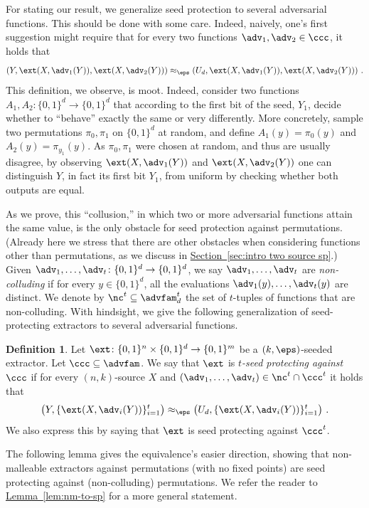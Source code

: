 \documentclass[11pt]{article}
\numberwithin{equation}{section}
\theoremstyle{definition}
\newtheorem{definition}[theorem]{Definition}
\theoremstyle{plain}
\newcommand{\expref}[2]{\hyperref[#2]{#1~\ref{#2}}}
\begin{document}
For stating our result, we generalize seed protection to several adversarial functions. This should be done with some care. Indeed, naively, one's first suggestion might require that for every two functions $\adv_1,\adv_2 \in \ccc$, it holds that
\[
\left(Y, \ext(X,\adv_1(Y)),\ext(X,\adv_2(Y))\right) \approx_\eps \left(U_d, \ext(X,\adv_1(Y)),\ext(X,\adv_2(Y))\right)\,.
\]
This definition, we observe, is moot. Indeed, consider two functions $A_1, A_2 \colon \{0,1\}^d \to \{0,1\}^d$ that according to the first bit of the seed, $Y_1$, decide whether to ``behave'' exactly the same or very differently. More concretely, sample two permutations $\pi_0,\pi_1$ on $\{0,1\}^d$ at random, and define $A_1(y) = \pi_0(y)$ and $A_2(y) = \pi_{y_1}(y)$.
As $\pi_0,\pi_1$ were chosen at random, and thus are usually disagree, by observing $\ext(X,\adv_1(Y))$ and $\ext(X,\adv_2(Y))$ one can distinguish $Y$, in fact its first bit $Y_1$, from uniform by checking whether both outputs are equal.

As we prove, this %
``collusion,''  %
%
in which two or more  %
adversarial functions attain the same value, is the only obstacle for seed protection against permutations.  %
%
(Already  %
here we stress that there are other obstacles when considering functions other than permutations, as we discuss
in \expref{Section}{sec:intro two source sp}.) %
%
Given $\adv_1,\ldots,\adv_t \colon \{0,1\}^d \rightarrow \{0,1\}^d$, we say $\adv_1,\ldots,\adv_t$ are
\emph{non-colluding} if for every $y \in \{0,1\}^d$, all the evaluations $\adv_1(y),\ldots,\adv_{t}(y)$ are distinct. We denote by $\nc^t \subseteq \advfam^t_d$ the set of $t$-tuples of functions that are non-colluding.
%
%
%
%
With hindsight, we give the following generalization of seed-protecting extractors to several adversarial functions.

\begin{definition}
Let $\ext \colon \{0,1\}^n \times \{0,1\}^d \to \{0,1\}^m$ be a $(k,\eps)$-seeded extractor. Let $\ccc \subseteq \advfam$. We say that $\ext$ is \emph{$t$-seed protecting against $\ccc$}
if for every $(n,k)$-source $X$ and $(\adv_1,\ldots,\adv_t) \in \nc^t \cap \ccc^t$ it holds that
\[
\left(Y, \{\ext(X,\adv_i(Y))\}_{i=1}^{t}\right) \approx_\eps \left(U_d, \{\ext(X,\adv_i(Y))\}_{i=1}^{t}\right)\,.
\]
We also express this by saying that $\ext$ is seed protecting against $\ccc^t$.
\end{definition}

The following lemma gives the equivalence's easier direction, showing that non-malleable extractors against permutations (with no fixed points) are seed protecting against (non-colluding) permutations. We refer the reader to \expref{Lemma}{lem:nm-to-sp} for a more general statement.
\end{document}
